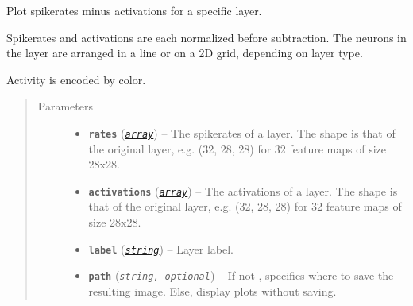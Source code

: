 \documentclass[letterpaper,10pt,english]{sphinxmanual}
\begin{document}
\begin{fulllineitems}
\label{snntoolbox.io_utils:snntoolbox.io_utils.plotting.plot_rates_minus_activations}
Plot spikerates minus activations for a specific layer.

Spikerates and activations are each normalized before subtraction.
The neurons in the layer are arranged in a line or on a 2D grid, depending
on layer type.

Activity is encoded by color.
\begin{quote}\begin{description}
\item[{Parameters}] \leavevmode\begin{itemize}
\item {} 
\textbf{\texttt{rates}} (\href{https://docs.python.org/library/array.html\#module-array}{\emph{\texttt{array}}}) -- The spikerates of a layer. The shape is that of the original layer,
e.g. (32, 28, 28) for 32 feature maps of size 28x28.

\item {} 
\textbf{\texttt{activations}} (\href{https://docs.python.org/library/array.html\#module-array}{\emph{\texttt{array}}}) -- The activations of a layer. The shape is that of the original layer,
e.g. (32, 28, 28) for 32 feature maps of size 28x28.

\item {} 
\textbf{\texttt{label}} (\href{https://docs.python.org/library/string.html\#module-string}{\emph{\texttt{string}}}) -- Layer label.

\item {} 
\textbf{\texttt{path}} (\emph{\texttt{string, optional}}) -- If not , specifies where to save the resulting image. Else,
display plots without saving.

\end{itemize}

\end{description}\end{quote}

\end{fulllineitems}

\end{document}
